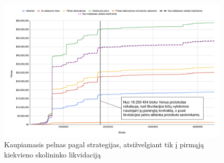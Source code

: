 \documentclass[]{VUMIFTemplateClass}
\begin{document}

\begin{figure}[H]
  \centering
  \includegraphics[scale=0.4]{img/bendras5.png}
  \caption{Kaupiamasis pelnas pagal strategijas, atsižvelgiant tik į pirmąją kiekvieno skolininko likvidaciją}
  \label{img:bendras2}
\end{figure}
\end{document}
